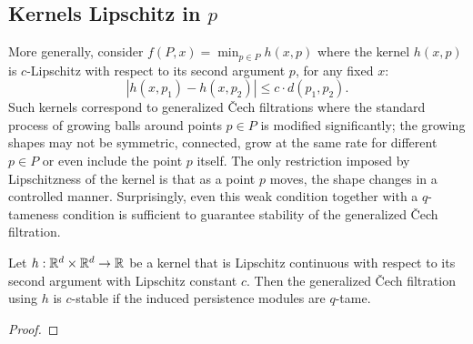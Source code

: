 \subsection{Kernels Lipschitz in $p$}

More generally, consider $f(P, x) = \min_{p \in P} h(x, p)$ where the kernel
$h(x, p)$ is $c$-Lipschitz with respect to its second argument $p$, for any
fixed $x$:
\begin{equation}
    |h(x, p_1) - h(x, p_2)| \leq c \cdot d(p_1, p_2).
\end{equation}
Such kernels correspond to generalized \v{C}ech filtrations where the standard
process of growing balls around points $p \in P$ is modified significantly;
the growing shapes may not be symmetric, connected, grow at the same rate for
different $p \in P$ or even include the point $p$ itself. The only restriction
imposed by Lipschitzness of the kernel is that as a point $p$ moves, the shape
changes in a controlled manner. Surprisingly, even this weak condition together
with a $q$-tameness condition is sufficient to guarantee stability of the
generalized \v{C}ech filtration.
\begin{theorem}
    Let $h : \mathbb{R}^d \times \mathbb{R}^d \to \mathbb{R}$ be a kernel that is Lipschitz continuous
    with respect to its second argument with Lipschitz constant $c$. Then the
    generalized \v{C}ech filtration using $h$ is $c$-stable if the induced
    persistence modules are $q$-tame.
\end{theorem}
\begin{proof}
    \todo{}
\end{proof}